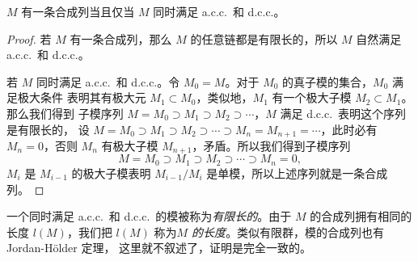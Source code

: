 \begin{proposition}
  $M$ 有一条合成列当且仅当 $M$ 同时满足 a.c.c.\ 和 d.c.c.。
\end{proposition}
\begin{proof}
  若 $M$ 有一条合成列，那么 $M$ 的任意链都是有限长的，所以 $M$ 自然满足 a.c.c.\ 和 d.c.c.。

  若 $M$ 同时满足 a.c.c.\ 和 d.c.c.。令 $M_0=M$。对于 $M_0$ 的真子模的集合，$M_0$ 满足极大条件
  表明其有极大元 $M_1\subset M_0$，类似地，$M_1$ 有一个极大子模 $M_2\subset M_1$。那么我们得到
  子模序列 $M=M_0\supset M_1\supset M_2\supset\cdots$，$M$ 满足 d.c.c.\ 表明这个序列是有限长的，
  设 $M=M_0\supset M_1\supset M_2\supset\cdots\supset M_n=M_{n+1}=\cdots$，此时必有 $M_n=0$，否则 $M_n$
  有极大子模 $M_{n+1}$，矛盾。所以我们得到子模序列
  \[
    M=M_0\supset M_1\supset M_2\supset\cdots\supset M_n=0,
  \]
  $M_{i}$ 是 $M_{i-1}$ 的极大子模表明 $M_{i-1}/M_i$ 是单模，所以上述序列就是一条合成列。
\end{proof}

一个同时满足 a.c.c.\ 和 d.c.c.\ 的模被称为\emph{有限长的}。由于 $M$ 的合成列拥有相同的长度
$l(M)$，我们把 $l(M)$ 称为\emph{$M$ 的长度}。类似有限群，模的合成列也有 Jordan-H\"older 定理，
这里就不叙述了，证明是完全一致的。


